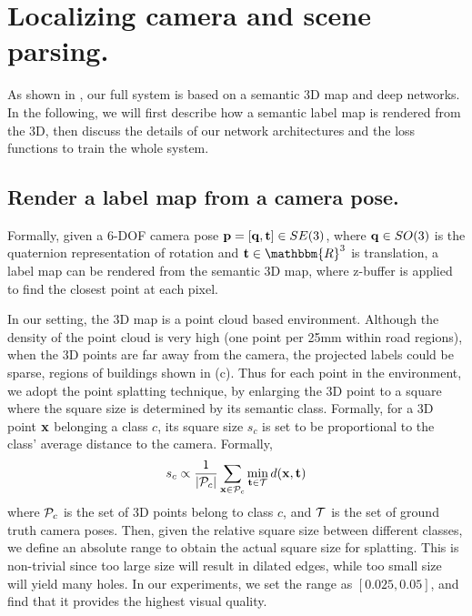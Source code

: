 
\vspace{-0.5\baselineskip}
\section{Localizing camera and scene parsing.}
\vspace{-0.3\baselineskip}
\label{sec:localize_and_parsing}
As shown in , our full system is based on a semantic 3D map and deep networks. In the following, we will first describe how a semantic label map is rendered from the 3D, then discuss the details of our network architectures and the loss functions to train the whole system.

\subsection{Render a label map from a camera pose.}
\label{sub:render}
Formally, given a 6-DOF camera pose ${\mathbf p} = [{\mathbf q}, {\mathbf t}] \in SE(3)$, where ${\mathbf q} \in SO(3)$ is the quaternion representation of rotation and $\ve{t} \in \mathbbm{R}^3$ is translation, a label map can be rendered from the semantic 3D map, where z-buffer is applied to find the closest point at each pixel.

In our setting, the 3D map is a point cloud based environment. 
Although the density of the point cloud is very high (one point per 25mm within road regions), when the 3D points are far away from the camera, the projected labels could be sparse, \eg regions of buildings shown in (c).
Thus for each point in the environment, we adopt the point splatting technique, by enlarging the 3D point to a square where the square size is determined by its semantic class. Formally, for a 3D point ${\mathbf x}$ belonging a class $c$, its square size $s_c$ is set to be proportional to the class' average distance to the camera. Formally,
{\vspace{-0.3\baselineskip}
\begin{align}
\label{eq:square_size}
s_c \propto \frac{1}{|{\mathcal P}_c|}\sum_{{\mathbf x}\in {\mathcal P}_c} \min_{{\mathbf t}\in{\mathcal T}} d({\mathbf x}, {\mathbf t})
\end{align}
}
where ${\mathcal P}_c$ is the set of 3D points belong to class $c$, and ${\mathcal T}$ is the set of ground truth camera poses. 
Then, given the relative square size between different classes, we define an absolute range to obtain the actual square size for splatting. This is non-trivial since too large size will result in dilated edges, while too small size will yield many holes. In our experiments, we set the range as $[0.025, 0.05]$, and find that it provides the highest visual quality.

